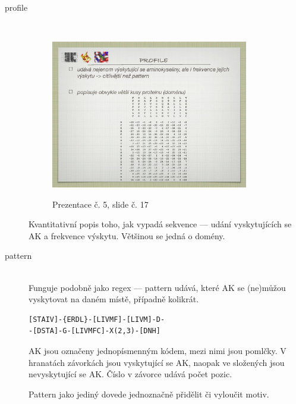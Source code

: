 \documentclass[DIV=8]{scrreprt}
\begin{document}
\begin{description}
\item[profile]\hfill \\
\begin{figure}
    \caption{Prezentace č. 5, slide č. 17}
    \includegraphics[width=0.85\textwidth]{slides-5/slide-17.jpg}
    \centering
    \label{slides-5-slide-17}
\end{figure}

Kvantitativní popis toho, jak vypadá sekvence --- udání vyskytujících se AK a frekvence výskytu. Většinou se jedná o domény.


\item[pattern]\hfill \\
Funguje podobně jako regex --- pattern udává, které AK se (ne)můžou vyskytovat na daném místě, případně kolikrát.

\begin{lstlisting}
[STAIV]-{ERDL}-[LIVMF]-[LIVM]-D-
-[DSTA]-G-[LIVMFC]-X(2,3)-[DNH]\end{lstlisting}

AK jsou označeny jednopísmenným kódem, mezi nimi jsou pomlčky. V hranatách závorkách jsou vyskytující se AK, naopak ve složených jsou nevyskytující se AK. Číslo v závorce udává počet pozic.

Pattern jako jediný dovede jednoznačně přidělit či vyloučit motiv.

\end{description}
\end{document}
